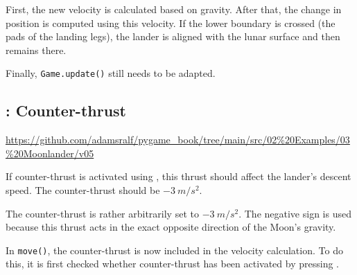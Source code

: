 
First, the new velocity is calculated based on gravity. After that, the change in position is computed using this velocity. If the lower boundary is crossed (the pads of the landing legs), the lander is aligned with the lunar surface and then remains there.


Finally, \texttt{Game.update()} still needs to be adapted.



\subsection{: Counter-thrust}
\begin{diskbox}
	\url{https://github.com/adamsralf/pygame_book/tree/main/src/02%20Examples/03%20Moonlander/v05}
\end{diskbox}

	If counter-thrust is activated using \keys{\SPACE}, this thrust should affect the lander’s descent speed. The counter-thrust should be $\SI{-3}{m/s^2}$.
\er

The counter-thrust is rather arbitrarily set to $\SI{-3}{m/s^2}$. The negative sign is used because this thrust acts in the exact opposite direction of the Moon’s gravity.


In \texttt{move()}, the counter-thrust is now included in the velocity calculation. To do this, it is first checked whether counter-thrust has been activated by pressing \keys{\SPACE}.


